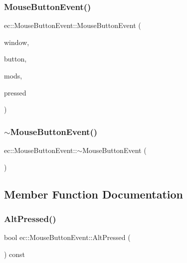 \subsubsection{\texorpdfstring{Mouse\+Button\+Event()}{MouseButtonEvent()}}
{\footnotesize\ttfamily ec\+::\+Mouse\+Button\+Event\+::\+Mouse\+Button\+Event (\begin{DoxyParamCaption}\item[{G\+L\+F\+Wwindow $\ast$}]{window,  }\item[{const int}]{button,  }\item[{const int}]{mods,  }\item[{const bool}]{pressed }\end{DoxyParamCaption})}

\mbox{\label{structec_1_1_mouse_button_event_af4e546257a07f8500dea2b49a79d644d}} 
\subsubsection{\texorpdfstring{$\sim$\+Mouse\+Button\+Event()}{~MouseButtonEvent()}}
{\footnotesize\ttfamily ec\+::\+Mouse\+Button\+Event\+::$\sim$\+Mouse\+Button\+Event (\begin{DoxyParamCaption}{ }\end{DoxyParamCaption})}



\subsection{Member Function Documentation}
\mbox{\label{structec_1_1_mouse_button_event_a2a63bd0d1b22a8afe549fa49d920643c}} 
\subsubsection{\texorpdfstring{Alt\+Pressed()}{AltPressed()}}
{\footnotesize\ttfamily bool ec\+::\+Mouse\+Button\+Event\+::\+Alt\+Pressed (\begin{DoxyParamCaption}{ }\end{DoxyParamCaption}) const}

